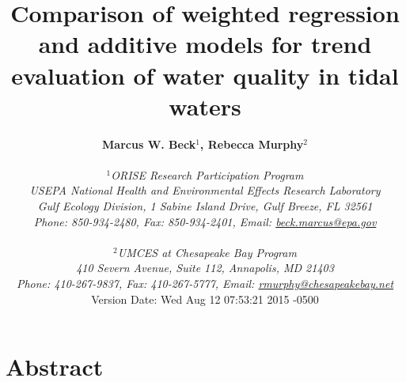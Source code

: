 \documentclass[letterpaper,12pt,oneside]{article}\usepackage[]{graphicx}\usepackage[]{color}
\begin{document}
\raggedbottom
\raggedright
{}
\setlength{\parindent}{0.5in}
\renewcommand\refname{References \vspace{12pt}}

\begin{singlespace}
\title{{\bf {\Large Comparison of weighted regression and additive models for trend evaluation of water quality in tidal waters}}}
\author{
  {\bf {\normalsize Marcus W. Beck$^1$, Rebecca Murphy$^2$}}
  \\\\{\textit {\normalsize $^1$ORISE Research Participation Program}}
  \\{\textit {\normalsize USEPA National Health and Environmental Effects Research Laboratory}}
  \\{\textit {\normalsize Gulf Ecology Division, 1 Sabine Island Drive, Gulf Breeze, FL 32561}}
	\\{\textit {\normalsize Phone: 850-934-2480, Fax: 850-934-2401, Email: \href{mailto:beck.marcus@epa.gov}{beck.marcus@epa.gov}}}
  \\\\{\textit {\normalsize $^2$UMCES at Chesapeake Bay Program}}
	\\{\textit {\normalsize 410 Severn Avenue, Suite 112, Annapolis, MD 21403}}
	\\{\textit {\normalsize Phone: 410-267-9837, Fax: 410-267-5777, Email: \href{mailto:rmurphy@chesapeakbay.net}{rmurphy@chesapeakebay.net}}}
  \vspace{1in} 
  \\ Version Date:   Wed Aug 12 07:53:21 2015 -0500
	}
\date{}
\maketitle
\end{singlespace}
\clearpage

\section*{Abstract}
\end{document}
